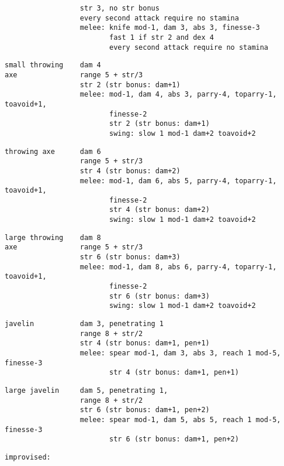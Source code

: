 \begin{samepage}
\begin{verbatim}
                  str 3, no str bonus
                  every second attack require no stamina
                  melee: knife mod-1, dam 3, abs 3, finesse-3
                         fast 1 if str 2 and dex 4
                         every second attack require no stamina
\end{verbatim} \blocklistgap \begin{verbatim}
small throwing    dam 4
axe               range 5 + str/3
                  str 2 (str bonus: dam+1)
                  melee: mod-1, dam 4, abs 3, parry-4, toparry-1, toavoid+1,
                         finesse-2
                         str 2 (str bonus: dam+1)
                         swing: slow 1 mod-1 dam+2 toavoid+2
\end{verbatim} \blocklistgap \begin{verbatim}
throwing axe      dam 6
                  range 5 + str/3
                  str 4 (str bonus: dam+2)
                  melee: mod-1, dam 6, abs 5, parry-4, toparry-1, toavoid+1,
                         finesse-2
                         str 4 (str bonus: dam+2)
                         swing: slow 1 mod-1 dam+2 toavoid+2
\end{verbatim} \blocklistgap \begin{verbatim}
large throwing    dam 8
axe               range 5 + str/3
                  str 6 (str bonus: dam+3)
                  melee: mod-1, dam 8, abs 6, parry-4, toparry-1, toavoid+1,
                         finesse-2
                         str 6 (str bonus: dam+3)
                         swing: slow 1 mod-1 dam+2 toavoid+2
\end{verbatim} \blocklistgap \begin{verbatim}
javelin           dam 3, penetrating 1
                  range 8 + str/2
                  str 4 (str bonus: dam+1, pen+1)
                  melee: spear mod-1, dam 3, abs 3, reach 1 mod-5, finesse-3
                         str 4 (str bonus: dam+1, pen+1)
\end{verbatim} \blocklistgap \begin{verbatim}
large javelin     dam 5, penetrating 1,
                  range 8 + str/2
                  str 6 (str bonus: dam+1, pen+2)
                  melee: spear mod-1, dam 5, abs 5, reach 1 mod-5, finesse-3
                         str 6 (str bonus: dam+1, pen+2)
\end{verbatim} \blocklistgap \begin{verbatim}
improvised:


\end{verbatim}
\end{samepage}
